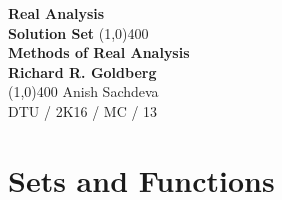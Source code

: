 \documentclass[11pt, letterpaper]{article}
\begin{document}
\begin{titlepage}
\begin{center}
\vspace*{1cm}
\Large{\textbf {Real Analysis}}\\
\Large{\textbf{Solution Set}}
\vfill
\line(1,0){400}\\[1mm]
\huge{\textbf{Methods of Real Analysis}}\\[3mm]
\Large{\textbf{Richard R. Goldberg}}\\[1mm]
\line(1,0){400}
\vfill
Anish Sachdeva\\
DTU / 2K16 / MC / 13\\
\end{center}
\end{titlepage}

\tableofcontents
\thispagestyle{empty}
\clearpage

\setcounter{page}{1}

\def\exr{Exercise}
\def\setc{\setcounter{equation}{0}}
\def\space{\,\,\,}
\def\spacem{\,\,\,\,}
\def\we{\mathrm{We \space know \space that}}
\def\wealso{\mathrm{We \space also \space know \space that}}
\def\from{\mathrm{From \space}}
\def\so{\mathrm{So, \space}}
\def\hence{\mathrm{Hence \spacem Proved}}
\def\no{\nonumber}

\section{Sets and Functions}
\end{document}
